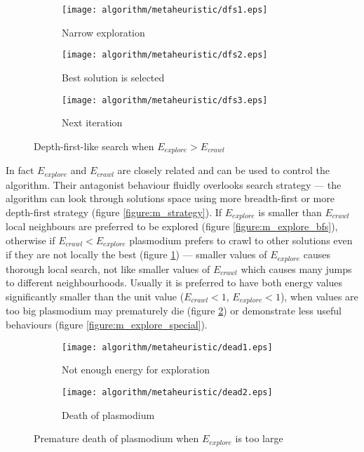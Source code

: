 \begin{figure}
  \centering

  \begin{subfigure}{0.3\textwidth}
    \centering
    \texttt{[image: algorithm/metaheuristic/dfs1.eps]}
    \caption{Narrow exploration}
  \end{subfigure}
  \begin{subfigure}{0.3\textwidth}
    \centering
    \texttt{[image: algorithm/metaheuristic/dfs2.eps]}
    \caption{Best solution is selected}
  \end{subfigure}
  \begin{subfigure}{0.3\textwidth}
    \centering
    \texttt{[image: algorithm/metaheuristic/dfs3.eps]}
    \caption{Next iteration}
  \end{subfigure}

  \caption{Depth-first-like search when $E_{explore} > E_{crawl}$}
  \label{figure:m_explore_dfs}
\end{figure}

In fact $E_{explore}$ and $E_{crawl}$ are closely related and can be used to control the algorithm. Their antagonist behaviour fluidly overlooks search strategy --- the algorithm can look through solutions space using more breadth-first or more depth-first strategy (figure \ref{figure:m_strategy}). If $E_{explore}$ is smaller than $E_{crawl}$ local neighbours are preferred to be explored (figure \ref{figure:m_explore_bfs}), otherwise if $E_{crawl} < E_{explore}$ plasmodium prefers to crawl to other solutions even if they are not locally the best (figure \ref{figure:m_explore_dfs}) --- smaller values of $E_{explore}$ causes thorough local search, not like smaller values of $E_{crawl}$ which causes many jumps to different neighbourhoods. Usually it is preferred to have both energy values significantly smaller than the unit value ($E_{crawl} < 1$, $E_{explore} < 1$), when values are too big plasmodium may prematurely die (figure \ref{figure:m_explore_dead}) or demonstrate less useful behaviours (figure \ref{figure:m_explore_special}).

\begin{figure}
  \centering

  \begin{subfigure}{0.3\textwidth}
    \centering
    \texttt{[image: algorithm/metaheuristic/dead1.eps]}
    \caption{Not enough energy for exploration}
  \end{subfigure}
  \begin{subfigure}{0.3\textwidth}
    \centering
    \texttt{[image: algorithm/metaheuristic/dead2.eps]}
    \caption{Death of plasmodium}
  \end{subfigure}

  \caption{Premature death of plasmodium when $E_{explore}$ is too large}
  \label{figure:m_explore_dead}
\end{figure}

